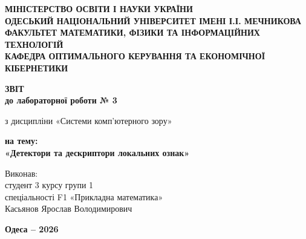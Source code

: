 \begin{titlepage}
    \thispagestyle{empty}
    \setlength{\parindent}{0pt}
    
    \begin{center}
        {\fontsize{12pt}{16pt}\selectfont\bfseries
        МІНІСТЕРСТВО ОСВІТИ І НАУКИ УКРАЇНИ\\[3pt]
        ОДЕСЬКИЙ НАЦІОНАЛЬНИЙ УНІВЕРСИТЕТ ІМЕНІ І.І. МЕЧНИКОВА\\[3pt]
        ФАКУЛЬТЕТ МАТЕМАТИКИ, ФІЗИКИ ТА ІНФОРМАЦІЙНИХ ТЕХНОЛОГІЙ\\[3pt]
        КАФЕДРА ОПТИМАЛЬНОГО КЕРУВАННЯ ТА ЕКОНОМІЧНОЇ КІБЕРНЕТИКИ\par}
    \end{center}

    \vspace{1.5cm}

    \begin{center}
        {\fontsize{18pt}{22pt}\selectfont\bfseries ЗВІТ\\
        до лабораторної роботи № 3\par}
        \vspace{0.4cm}
        {\fontsize{14pt}{18pt}\selectfont
        з дисципліни «Системи комп’ютерного зору»\par}
        \vspace{0.4cm}
        {\fontsize{16pt}{20pt}\selectfont\bfseries
        на тему:\\[6pt]
        «Детектори та дескриптори локальних ознак»\par}
    \end{center}

    \vspace{1.5cm}

    \hfill
    \begin{minipage}{0.60\textwidth}
        \raggedright
        {\fontsize{14pt}{19pt}\selectfont
        Виконав:\\[2pt]
        студент 3 курсу групи 1\\[2pt]
        спеціальності F1 «Прикладна математика»\\[2pt]
        Касьянов Ярослав Володимирович
        }
    \end{minipage}

    \vfill

    \begin{center}
        {\fontsize{12pt}{14pt}\selectfont\bfseries Одеса -- 2026\par}
    \end{center}
\end{titlepage}

\setcounter{page}{2}

